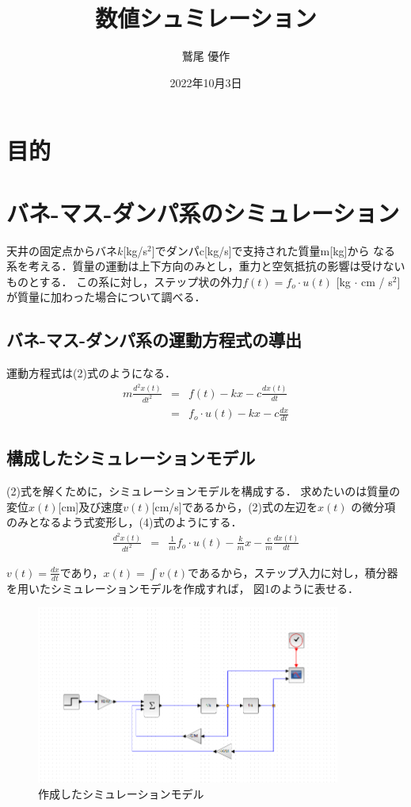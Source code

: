 \documentclass[dvipdfmx,titlepage,a4j]{jsarticle}  %
\title{数値シュミレーション}
\author{鷲尾 優作}
\date{2022年10月3日}
\begin{document}
\pagestyle{foot}

\maketitle

\section{目的}
\section{バネ-マス-ダンパ系のシミュレーション}

天井の固定点からバネ$k$[kg/s$^2$]でダンパc[kg/s]で支持された質量m[kg]から
なる系を考える．質量の運動は上下方向のみとし，重力と空気抵抗の影響は受けないものとする．
この系に対し，ステップ状の外力$f(t) = f_o \cdot u(t)$ [kg $\cdot$ cm / s$^2$]
が質量に加わった場合について調べる．

\subsection{バネ-マス-ダンパ系の運動方程式の導出}

運動方程式は(2)式のようになる．
\begin{eqnarray}
  m \frac{d^2x(t)}{dt^2} &=& f(t) - kx - c \frac{dx(t)}{dt}\\
  &=& f_o \cdot u(t) - kx - c \frac{dx}{dt}
\end{eqnarray}

\subsection{構成したシミュレーションモデル}

(2)式を解くために，シミュレーションモデルを構成する．
求めたいのは質量の変位$x(t)$[cm]及び速度$v(t)$[cm/s]であるから，(2)式の左辺を$x(t)$
の微分項のみとなるよう式変形し，(4)式のようにする．
\begin{eqnarray}
  \frac{d^2x(t)}{dt^2} &=&  \frac{1}{m} f_o \cdot u(t) - \frac{k}{m} x - \frac{c}{m} \frac{dx(t)}{dt}
\end{eqnarray}

$v(t) = \frac{dx}{dt}$であり，$x(t) = \int v(t)$であるから，ステップ入力に対し，積分器を用いたシミュレーションモデルを作成すれば，
図1のように表せる．

\begin{figure}[H]
  \centering
  \includegraphics[width=10cm]{../graph/bane-model.png}
  \caption{作成したシミュレーションモデル}
  \label{fig:bane-model.png}
\end{figure}
\end{document}

